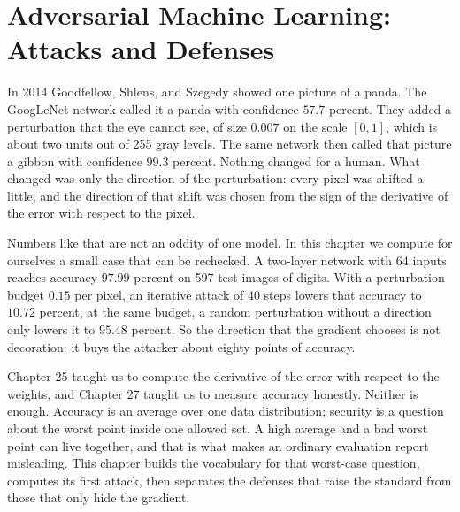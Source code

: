 \chapter[Adversarial Machine Learning]{Adversarial Machine Learning: Attacks and Defenses}

In 2014 Goodfellow, Shlens, and Szegedy showed one picture of a panda. The GoogLeNet
network called it a panda with confidence $57.7$ percent. They added a perturbation
that the eye cannot see, of size $0.007$ on the scale $[0,1]$, which is about two
units out of 255 gray levels. The same network then called that picture a gibbon with
confidence $99.3$ percent. Nothing changed for a human. What changed was only the
direction of the perturbation: every pixel was shifted a little, and the direction of
that shift was chosen from the sign of the derivative of the error with respect to the
pixel.

Numbers like that are not an oddity of one model. In this chapter we compute for
ourselves a small case that can be rechecked. A two-layer network with 64 inputs
reaches accuracy $97.99$ percent on 597 test images of digits. With a perturbation
budget $0.15$ per pixel, an iterative attack of 40 steps lowers that accuracy to
$10.72$ percent; at the same budget, a random perturbation without a direction only
lowers it to $95.48$ percent. So the direction that the gradient chooses is not
decoration: it buys the attacker about eighty points of accuracy.

Chapter 25 taught us to compute the derivative of the error with respect to the
weights, and Chapter 27 taught us to measure accuracy honestly. Neither is enough.
Accuracy is an average over one data distribution; security is a question about the
worst point inside one allowed set. A high average and a bad worst point can live
together, and that is what makes an ordinary evaluation report misleading. This
chapter builds the vocabulary for that worst-case question, computes its first attack,
then separates the defenses that raise the standard from those that only hide the
gradient.

